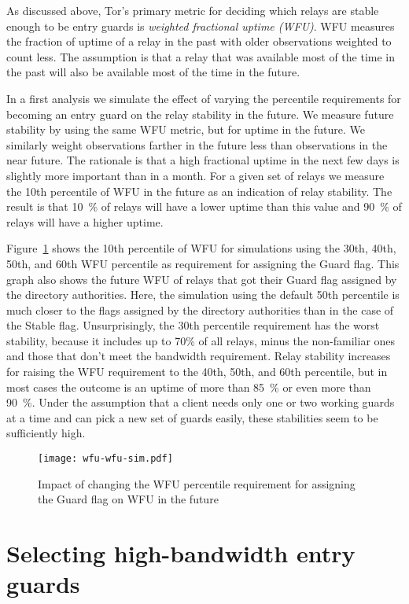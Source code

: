 \documentclass{article}
\begin{document}
As discussed above, Tor's primary metric for deciding which relays are
stable enough to be entry guards is \emph{weighted fractional uptime
(WFU)}.
WFU measures the fraction of uptime of a relay in the past with older
observations weighted to count less.
The assumption is that a relay that was available most of the time in the
past will also be available most of the time in the future.

In a first analysis we simulate the effect of varying the percentile
requirements for becoming an entry guard on the relay stability in the
future.
We measure future stability by using the same WFU metric, but for uptime
in the future.
We similarly weight observations farther in the future less than
observations in the near future.
The rationale is that a high fractional uptime in the next few days is
slightly more important than in a month.
For a given set of relays we measure the 10th percentile of WFU in the
future as an indication of relay stability.
The result is that 10~\% of relays will have a lower uptime than this
value and 90~\% of relays will have a higher uptime.

Figure~\ref{fig:wfu-wfu-sim} shows the 10th percentile of WFU for simulations
using the 30th, 40th, 50th, and 60th WFU percentile as requirement for
assigning the Guard flag.
This graph also shows the future WFU of relays that got their Guard flag
assigned by the directory authorities.
Here, the simulation using the default 50th percentile is much closer to
the flags assigned by the directory authorities than in the case of the
Stable flag.
Unsurprisingly, the 30th percentile requirement has the worst stability,
because it includes up to 70\% of all relays, minus the non-familiar ones
and those that don't meet the bandwidth requirement.
Relay stability increases for raising the WFU requirement to the 40th,
50th, and 60th percentile, but in most cases the outcome is an uptime of
more than 85~\% or even more than 90~\%.
Under the assumption that a client needs only one or two working guards at
a time and can pick a new set of guards easily, these stabilities seem to
be sufficiently high.

\begin{figure}[t]
\texttt{[image: wfu-wfu-sim.pdf]}
\caption{Impact of changing the WFU percentile requirement for assigning
the Guard flag on WFU in the future}
\label{fig:wfu-wfu-sim}
\end{figure}

\section{Selecting high-bandwidth entry guards}
\end{document}
